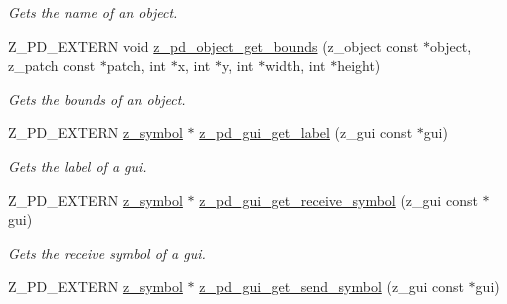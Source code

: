 \begin{DoxyCompactItemize}
\begin{DoxyCompactList}\small\item\em Gets the name of an object. \end{DoxyCompactList}\item 
\hypertarget{group__zpd_ga8f55bc3897108bf335d3d9c2f6e39dda}{Z\-\_\-\-P\-D\-\_\-\-E\-X\-T\-E\-R\-N void \hyperlink{group__zpd_ga8f55bc3897108bf335d3d9c2f6e39dda}{z\-\_\-pd\-\_\-object\-\_\-get\-\_\-bounds} (z\-\_\-object const $\ast$object, z\-\_\-patch const $\ast$patch, int $\ast$x, int $\ast$y, int $\ast$width, int $\ast$height)}\label{group__zpd_ga8f55bc3897108bf335d3d9c2f6e39dda}

\begin{DoxyCompactList}\small\item\em Gets the bounds of an object. \end{DoxyCompactList}\item 
\hypertarget{group__zpd_gabbacabb28ecbf988c3d18a61ee251eec}{Z\-\_\-\-P\-D\-\_\-\-E\-X\-T\-E\-R\-N \hyperlink{group__zpd_ga43e609e9bccc7a2018b8f16558b9494c}{z\-\_\-symbol} $\ast$ \hyperlink{group__zpd_gabbacabb28ecbf988c3d18a61ee251eec}{z\-\_\-pd\-\_\-gui\-\_\-get\-\_\-label} (z\-\_\-gui const $\ast$gui)}\label{group__zpd_gabbacabb28ecbf988c3d18a61ee251eec}

\begin{DoxyCompactList}\small\item\em Gets the label of a gui. \end{DoxyCompactList}\item 
\hypertarget{group__zpd_ga3c667c5f4deb1c3782f5f665f3f1a9a9}{Z\-\_\-\-P\-D\-\_\-\-E\-X\-T\-E\-R\-N \hyperlink{group__zpd_ga43e609e9bccc7a2018b8f16558b9494c}{z\-\_\-symbol} $\ast$ \hyperlink{group__zpd_ga3c667c5f4deb1c3782f5f665f3f1a9a9}{z\-\_\-pd\-\_\-gui\-\_\-get\-\_\-receive\-\_\-symbol} (z\-\_\-gui const $\ast$gui)}\label{group__zpd_ga3c667c5f4deb1c3782f5f665f3f1a9a9}

\begin{DoxyCompactList}\small\item\em Gets the receive symbol of a gui. \end{DoxyCompactList}\item 
\hypertarget{group__zpd_ga4f24b74b79e1c8720990919a29466f26}{Z\-\_\-\-P\-D\-\_\-\-E\-X\-T\-E\-R\-N \hyperlink{group__zpd_ga43e609e9bccc7a2018b8f16558b9494c}{z\-\_\-symbol} $\ast$ \hyperlink{group__zpd_ga4f24b74b79e1c8720990919a29466f26}{z\-\_\-pd\-\_\-gui\-\_\-get\-\_\-send\-\_\-symbol} (z\-\_\-gui const $\ast$gui)}\label{group__zpd_ga4f24b74b79e1c8720990919a29466f26}


\end{DoxyCompactItemize}

